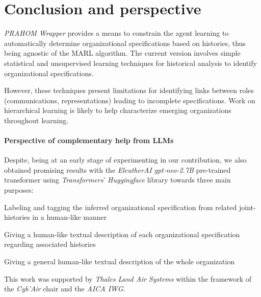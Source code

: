 \documentclass[doubleblind]{ecai}
\begin{document}
\section{Conclusion and perspective}

\emph{PRAHOM Wrapper} provides a means to constrain the agent learning to automatically determine organizational specifications based on histories, thus being agnostic of the MARL algorithm.
The current version involves simple statistical and unsupervised learning techniques for historical analysis to identify organizational specifications.

However, these techniques present limitations for identifying links between roles (communications, representations) leading to incomplete specifications.
Work on hierarchical learning is likely to help characterize emerging organizations throughout learning.


\paragraph{Perspective of complementary help from LLMs}

Despite, being at an early stage of experimenting in our contribution, we also obtained promising results with the \emph{EleutherAI} \emph{gpt-neo-2.7B} pre-trained transformer using \emph{Transformers}' \emph{Huggingface} library towards three main purposes:
\begin{enumerate*}[label=\roman*),itemjoin={;\quad}]
    \item Labeling and tagging the inferred organizational specification from related joint-histories in a human-like manner
    \item Giving a human-like textual description of each organizational specification regarding associated histories
    \item Giving a general human-like textual description of the whole organization
\end{enumerate*}






\begin{ack}
    This work was supported by \emph{Thales Land Air Systems} within the framework of the \emph{Cyb'Air} chair and the \emph{AICA IWG}.
\end{ack}



\newpage

% 

\end{document}
